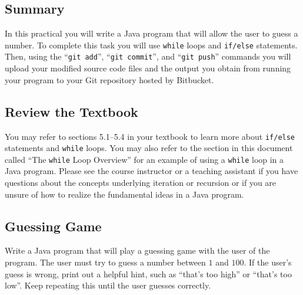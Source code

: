 



\subsection*{Summary}
\vspace*{-.05in}
In this practical you will write a Java program that will allow the user to guess a number. To complete this task you will use {\tt while} loops and {\tt if/else} statements.  Then, using the ``{\tt git add}'', ``{\tt git  commit}'', and ``{\tt git push}'' commands you will
upload your modified source code files and the output you obtain from running your program to your Git repository hosted
by Bitbucket.

\vspace*{-.1in}
\subsection*{Review the Textbook}
\vspace*{-.05in}

You may refer to sections 5.1--5.4 in your textbook to learn more about {\tt if/else} statements and {\tt while} loops.
You may also refer to the section in this document called ``The {\tt while} Loop Overview'' for an example of using a
{\tt while} loop in a Java program. Please see the course instructor or a teaching assistant if you have questions about
the concepts underlying iteration or recursion or if you are unsure of how to realize the fundamental ideas in a Java
program.

\vspace*{-.1in}
\subsection*{Guessing Game}
\vspace*{-.05in}
Write a Java program that will play a guessing game with the user of the program.
The user must try to guess a number between $1$ and $100$. If the user's
guess is wrong, print out a helpful hint, such as ``that's too high'' or
``that's too low''. Keep repeating this until the user guesses correctly.

